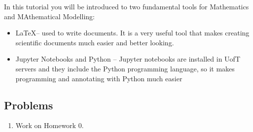 		\begin{objectives}
			In this tutorial you will be introduced to two fundamental tools for Mathematics and MAthematical Modelling:
				\begin{itemize}
					\item \LaTeX -- used to write documents. It is a very useful tool that makes creating scientific documents much easier and better looking.
					\item Jupyter Notebooks and Python -- Jupyter notebooks are installed in UofT servers and they include the Python programming language, so it makes programming and annotating with Python much easier
				\end{itemize}
		\end{objectives}

\vspace{-.5em}
\subsection*{Problems}
\vspace{-.5em}


\begin{enumerate}
	\item\label{q1} Work on Homework 0.

	
	
	
	
	
\end{enumerate}


















